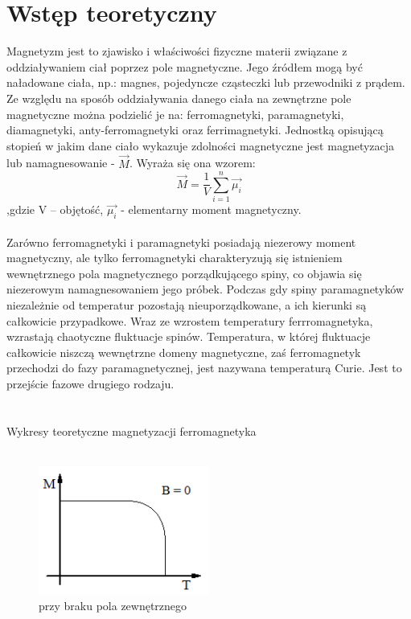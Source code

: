 \documentclass[a4paper,10pt]{article}
\begin{document}
\section{Wstęp teoretyczny}
Magnetyzm jest to zjawisko i właściwości fizyczne materii związane z oddziaływaniem ciał poprzez pole magnetyczne. Jego źródłem mogą być naładowane ciała, np.:
magnes, pojedyncze cząsteczki lub przewodniki z prądem. Ze względu na sposób oddziaływania danego ciała na zewnętrzne pole magnetyczne można podzielić je na:
ferromagnetyki, paramagnetyki, diamagnetyki, anty-ferromagnetyki oraz ferrimagnetyki. Jednostką opisującą stopień w jakim dane ciało wykazuje zdolności magnetyczne jest magnetyzacja lub namagnesowanie - $\vec{M}$. Wyraża się ona wzorem:
\begin{equation}
\vec{M} =\frac{1}{V} \sum_{i=1}^n \vec{\mu_i}
\end{equation}
,gdzie V – objętość, $\vec{\mu_i}$ - elementarny moment magnetyczny.
\\
\\Zarówno ferromagnetyki i paramagnetyki posiadają niezerowy moment magnetyczny, ale  tylko ferromagnetyki
charakteryzują się istnieniem wewnętrznego pola magnetycznego porządkującego spiny, co objawia się niezerowym namagnesowaniem jego próbek.
Podczas gdy spiny paramagnetyków niezależnie od temperatur pozostają nieuporządkowane, a ich kierunki są całkowicie przypadkowe. Wraz ze wzrostem
temperatury ferrromagnetyka, wzrastają chaotyczne fluktuacje spinów. Temperatura, w której fluktuacje całkowicie niszczą wewnętrzne domeny magnetyczne,
zaś ferromagnetyk przechodzi do fazy paramagnetycznej, jest nazywana temperaturą Curie. Jest to przejście fazowe drugiego rodzaju.\\\\
\\
Wykresy teoretyczne magnetyzacji ferromagnetyka\\
\\
\begin{figure}[H]
		\includegraphics[width=0.5\textwidth]{wykres1.png}
		\caption{przy braku pola zewnętrznego}
\end{figure}
\end{document}
